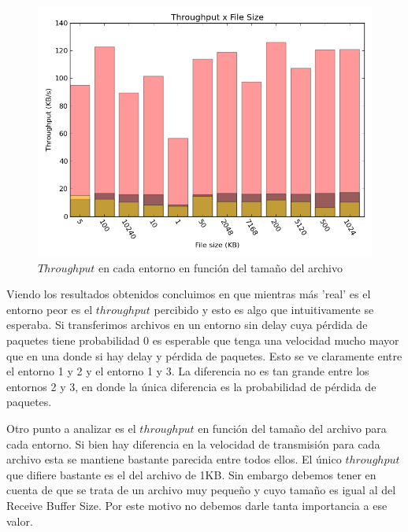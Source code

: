 \begin{figure}[H]
	\begin{center}
		  \includegraphics[scale=0.5]{../graficos/test1_1.png}
		  \caption{$Throughput$ en cada entorno en función del tamaño del archivo}
		  \label{fig:contra1}
	\end{center}
\end{figure}

Viendo los resultados obtenidos concluimos en que mientras más 'real' es el entorno peor es el $throughput$ percibido y esto es algo que intuitivamente se esperaba. Si transferimos archivos en un entorno sin delay cuya pérdida de paquetes tiene probabilidad 0 es esperable que tenga una velocidad mucho mayor que en una donde si hay delay y pérdida de paquetes. Esto se ve claramente entre el entorno 1 y 2 y el entorno 1 y 3. La diferencia no es tan grande entre los entornos 2 y 3, en donde la única diferencia es la probabilidad de pérdida de paquetes.

Otro punto a analizar es el $throughput$ en función del tamaño del archivo para cada entorno. Si bien hay diferencia en la velocidad de transmisión para cada archivo esta se mantiene bastante parecida entre todos ellos. El único $throughput$ que difiere bastante es el del archivo de 1KB. Sin embargo debemos tener en cuenta de que se trata de un archivo muy pequeño y cuyo tamaño es igual al del Receive Buffer Size. Por este motivo no debemos darle tanta importancia a ese valor.


